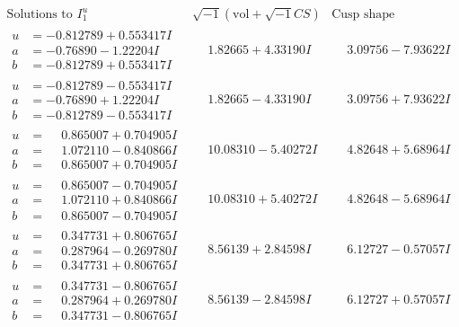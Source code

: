 \documentclass[1p]{elsarticle_modified}
\theoremstyle{definition}
\newcommand{\I}{\sqrt{-1}}
\begin{document}
$$\begin{array}{c|c|c}  
\text{Solutions to }I^u_{1}& \I (\text{vol} + \sqrt{-1}CS) & \text{Cusp shape}\\
 \hline 
\begin{aligned}
u &= -0.812789 + 0.553417 I \\
a &= -0.76890 - 1.22204 I \\
b &= -0.812789 + 0.553417 I\end{aligned}
 & \phantom{-}1.82665 + 4.33190 I & \phantom{-}3.09756 - 7.93622 I \\ \hline\begin{aligned}
u &= -0.812789 - 0.553417 I \\
a &= -0.76890 + 1.22204 I \\
b &= -0.812789 - 0.553417 I\end{aligned}
 & \phantom{-}1.82665 - 4.33190 I & \phantom{-}3.09756 + 7.93622 I \\ \hline\begin{aligned}
u &= \phantom{-}0.865007 + 0.704905 I \\
a &= \phantom{-}1.072110 - 0.840866 I \\
b &= \phantom{-}0.865007 + 0.704905 I\end{aligned}
 & \phantom{-}10.08310 - 5.40272 I & \phantom{-}4.82648 + 5.68964 I \\ \hline\begin{aligned}
u &= \phantom{-}0.865007 - 0.704905 I \\
a &= \phantom{-}1.072110 + 0.840866 I \\
b &= \phantom{-}0.865007 - 0.704905 I\end{aligned}
 & \phantom{-}10.08310 + 5.40272 I & \phantom{-}4.82648 - 5.68964 I \\ \hline\begin{aligned}
u &= \phantom{-}0.347731 + 0.806765 I \\
a &= \phantom{-}0.287964 - 0.269780 I \\
b &= \phantom{-}0.347731 + 0.806765 I\end{aligned}
 & \phantom{-}8.56139 + 2.84598 I & \phantom{-}6.12727 - 0.57057 I \\ \hline\begin{aligned}
u &= \phantom{-}0.347731 - 0.806765 I \\
a &= \phantom{-}0.287964 + 0.269780 I \\
b &= \phantom{-}0.347731 - 0.806765 I\end{aligned}
 & \phantom{-}8.56139 - 2.84598 I & \phantom{-}6.12727 + 0.57057 I \\ \hline\begin{aligned}

\end{aligned}
\end{array}$$
\end{document}
